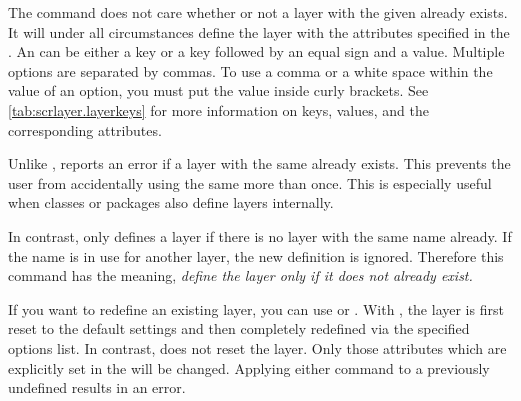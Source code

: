 The  command does not care whether or not a layer with the
given  already exists. It will under all circumstances
define the layer with the attributes specified in the . An
 can be either a key or a key followed by an equal sign and
a value. Multiple options are separated by commas. To use a comma or a white
space within the value of an option, you must put the value inside curly
brackets. See \autoref{tab:scrlayer.layerkeys} for more information on keys,
values, and the corresponding attributes.

Unlike ,  reports an error if a
layer with the same  already exists. This prevents the user
from accidentally using the same  more than once. This
is especially useful when classes or packages also define layers internally.

In contrast,  only defines a layer if there is no layer
with the same name already. If the name is in use for another layer, the new
definition is ignored. Therefore this command has the meaning, \emph{define
	the layer only if it does not already exist.}

If you want to redefine an existing layer, you can use 
or . With , the layer is first reset
to the default settings and then completely redefined via the specified
options list. In contrast,  does not reset the layer.
Only those attributes which are explicitly set in the  will
be changed. Applying either command to a previously undefined  results in an error.


